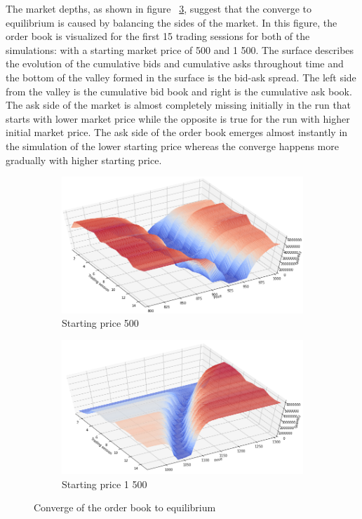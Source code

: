The market depths, as shown in figure ~\ref{fig:market_depths}, suggest that the
converge to equilibrium is caused by balancing the sides of the market. 
In this figure, the order book is visualized for the first 15 trading sessions
for both of the simulations: with a starting market price of 500 and 1 500. 
The surface describes the evolution of the cumulative bids and cumulative asks 
throughout time and the bottom of the valley formed in the surface is the bid-ask spread. 
The left side from the valley is the cumulative bid book and right is the cumulative ask book. 
The ask side of the market is almost completely missing initially in the run that
starts with lower market price while the opposite is true for the run with higher
initial market price. The ask side of the order book emerges almost instantly 
in the simulation of the lower starting price whereas the converge happens more 
gradually with higher starting price.


\begin{figure}
    \centering
    \begin{subfigure}{.5\textwidth}
      \centering
      \includegraphics[width=\linewidth]{plots/basic_market_depth_converge_lower.png}
      \caption{Starting price 500}
      \label{fig:market_depth_lower}
    \end{subfigure}%
    \begin{subfigure}{.5\textwidth}
      \centering
      \includegraphics[width=\linewidth]{plots/basic_market_depth_converge_higher.png}
      \caption{Starting price 1 500}
      \label{fig:market_depth_higher}
    \end{subfigure}
    \caption{Converge of the order book to equilibrium}
    \label{fig:market_depths}
\end{figure}

